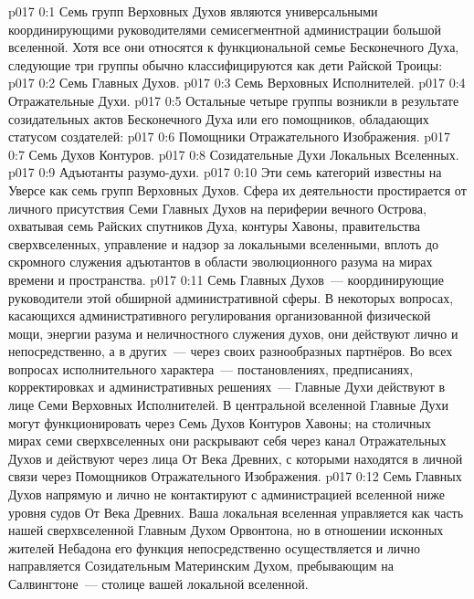 \author{Божественный Советник}
\vs p017 0:1 Семь групп Верховных Духов являются универсальными координирующими руководителями семисегментной администрации большой вселенной. Хотя все они относятся к функциональной семье Бесконечного Духа, следующие три группы обычно классифицируются как дети Райской Троицы:
\vs p017 0:2 Семь Главных Духов.
\vs p017 0:3 Семь Верховных Исполнителей.
\vs p017 0:4 Отражательные Духи.
\vs p017 0:5 \pc Остальные четыре группы возникли в результате созидательных актов Бесконечного Духа или его помощников, обладающих статусом создателей:
\vs p017 0:6 Помощники Отражательного Изображения.
\vs p017 0:7 Семь Духов Контуров.
\vs p017 0:8 Созидательные Духи Локальных Вселенных.
\vs p017 0:9 Адъютанты разумо\hyp{}духи.
\vs p017 0:10 \pc Эти семь категорий известны на Уверсе как семь групп Верховных Духов. Сфера их деятельности простирается от личного присутствия Семи Главных Духов на периферии вечного Острова, охватывая семь Райских спутников Духа, контуры Хавоны, правительства сверхвселенных, управление и надзор за локальными вселенными, вплоть до скромного служения адъютантов в области эволюционного разума на мирах времени и пространства.
\vs p017 0:11 Семь Главных Духов~--- координирующие руководители этой обширной административной сферы. В некоторых вопросах, касающихся административного регулирования организованной физической мощи, энергии разума и неличностного служения духов, они действуют лично и непосредственно, а в других~--- через своих разнообразных партнёров. Во всех вопросах исполнительного характера~--- постановлениях, предписаниях, корректировках и административных решениях~--- Главные Духи действуют в лице Семи Верховных Исполнителей. В центральной вселенной Главные Духи могут функционировать через Семь Духов Контуров Хавоны; на столичных мирах семи сверхвселенных они раскрывают себя через канал Отражательных Духов и действуют через лица От Века Древних, с которыми находятся в личной связи через Помощников Отражательного Изображения.
\vs p017 0:12 Семь Главных Духов напрямую и лично не контактируют с администрацией вселенной ниже уровня судов От Века Древних. Ваша локальная вселенная управляется как часть нашей сверхвселенной Главным Духом Орвонтона, но в отношении исконных жителей Небадона его функция непосредственно осуществляется и лично направляется Созидательным Материнским Духом, пребывающим на Салвингтоне~--- столице вашей локальной вселенной.
